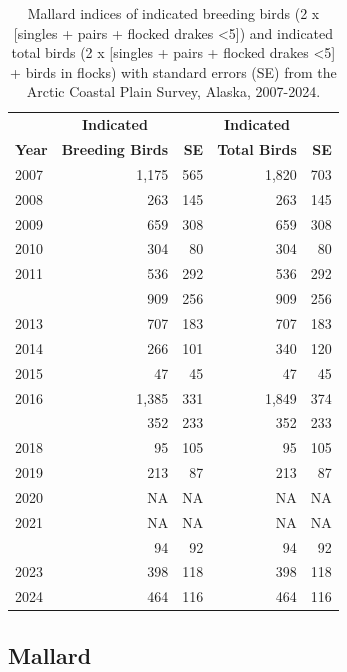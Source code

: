 \documentclass[
]{article}
\begin{document}
\begin{longtable}[t]{lrrrr}

\caption{\label{tbl-MALL}Mallard indices of indicated breeding birds (2
x {[}singles + pairs + flocked drakes \textless5{]}) and indicated total
birds (2 x {[}singles + pairs + flocked drakes \textless5{]} + birds in
flocks) with standard errors (SE) from the Arctic Coastal Plain Survey,
Alaska, 2007-2024.}

\tabularnewline

\\
\toprule
\multicolumn{1}{c}{\textbf{ }} & \multicolumn{1}{c}{\textbf{Indicated}} & \multicolumn{1}{c}{\textbf{ }} & \multicolumn{1}{c}{\textbf{Indicated}} & \multicolumn{1}{c}{\textbf{ }} \\
\cmidrule(l{3pt}r{3pt}){2-2} \cmidrule(l{3pt}r{3pt}){4-4}
\textbf{Year} & \textbf{Breeding Birds} & \textbf{SE} & \textbf{Total Birds} & \textbf{SE}\\
\midrule
2007 & 1,175 & 565 & 1,820 & 703\\
2008 & 263 & 145 & 263 & 145\\
2009 & 659 & 308 & 659 & 308\\
2010 & 304 & 80 & 304 & 80\\
2011 & 536 & 292 & 536 & 292\\
\addlinespace
2012 & 909 & 256 & 909 & 256\\
2013 & 707 & 183 & 707 & 183\\
2014 & 266 & 101 & 340 & 120\\
2015 & 47 & 45 & 47 & 45\\
2016 & 1,385 & 331 & 1,849 & 374\\
\addlinespace
2017 & 352 & 233 & 352 & 233\\
2018 & 95 & 105 & 95 & 105\\
2019 & 213 & 87 & 213 & 87\\
2020 & NA & NA & NA & NA\\
2021 & NA & NA & NA & NA\\
\addlinespace
2022 & 94 & 92 & 94 & 92\\
2023 & 398 & 118 & 398 & 118\\
2024 & 464 & 116 & 464 & 116\\
\bottomrule

\end{longtable}

\endgroup{}

\newpage{}

\subsection*{Mallard}\label{mallard-2}
\end{document}
